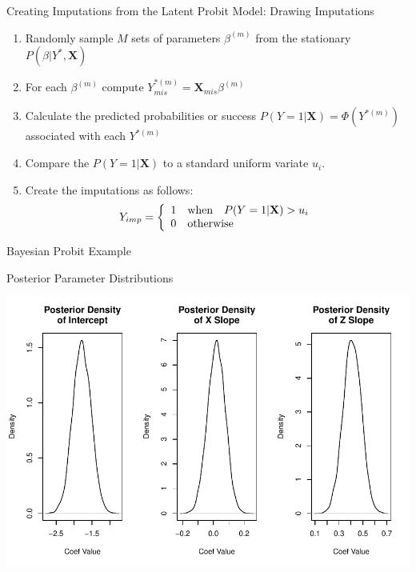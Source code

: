 \documentclass{beamer}
\begin{document}
\begin{frame}{Creating Imputations from the Latent Probit Model:
    Drawing Imputations}

  \begin{enumerate}
  \item Randomly sample $M$ sets of parameters $\beta^{(m)}$ from the
    stationary $P(\beta | Y^*, \mathbf{X})$
    \vspace{6pt}
  \item For each $\beta^{(m)}$ compute $Y_{mis}^{*(m)} =
    \mathbf{X}_{mis} \beta^{(m)}$
    \vspace{6pt}
  \item Calculate the predicted probabilities or success
    $P(Y = 1 | \mathbf{X}) = \Phi(Y^{*(m)})$ associated with each
    $Y^{*(m)}$
    \vspace{6pt}
  \item Compare the $P(Y = 1 | \mathbf{X})$ to a standard uniform
    variate $u_i$.
    \vspace{6pt}
  \item Create the imputations as follows:
    \begin{align*}
      Y_{imp} = \left\{ \begin{array}{ccl}
                          1 & \text{when} & P(Y = 1 | \mathbf{X}) > u_i\\
                          0 & \multicolumn{2}{l}{\text{otherwise}}
                        \end{array}\right.
    \end{align*}
  \end{enumerate}

\end{frame}


\begin{frame}[allowframebreaks]{Bayesian Probit Example}



\pagebreak



\end{frame}


\begin{frame}{Posterior Parameter Distributions}


\includegraphics{sweaveFiles/lecture5-013}

\end{frame}
\end{document}
